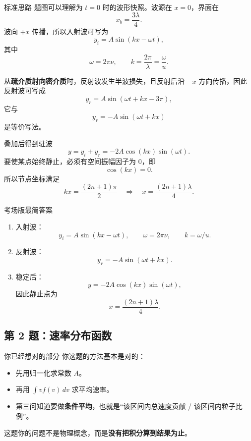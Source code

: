 \documentclass[11pt,a4paper]{ctexart}
\newcommand{\key}[1]{\textcolor{theme}{\textbf{#1}}}
\begin{document}
\begin{stepbox}{标准思路}
题图可以理解为 \(t=0\) 时的波形快照。波源在 \(x=0\)，界面在
\[
x_b=\frac{3\lambda}{4}.
\]
波向 \(+x\) 传播，所以入射波可写为
\[
y_i = A\sin(kx-\omega t),
\]
其中
\[
\omega = 2\pi \nu,\qquad k=\frac{2\pi}{\lambda}=\frac{\omega}{u}.
\]

从\key{疏介质射向密介质}时，反射波发生半波损失，且反射后沿 \(-x\) 方向传播，因此反射波可写成
\[
y_r = A\sin(\omega t + kx - 3\pi),
\]
它与
\[
y_r=-A\sin(\omega t+kx)
\]
是等价写法。

叠加后得到驻波
\[
y=y_i+y_r=-2A\cos(kx)\sin(\omega t).
\]
要使某点始终静止，必须有空间振幅因子为 0，即
\[
\cos(kx)=0.
\]
所以节点坐标满足
\[
kx=\frac{(2n+1)\pi}{2}
\quad\Rightarrow\quad
x=\frac{(2n+1)\lambda}{4}.
\]
\end{stepbox}

\begin{summarybox}{考场版最简答案}
\begin{enumerate}
  \item 入射波：
  \[
  y_i=A\sin(kx-\omega t),\qquad \omega=2\pi\nu,\qquad k=\omega/u.
  \]
  \item 反射波：
  \[
  y_r=-A\sin(\omega t+kx).
  \]
  \item 稳定后：
  \[
  y=-2A\cos(kx)\sin(\omega t),
  \]
  因此静止点为
  \[
  x=\frac{(2n+1)\lambda}{4}.
  \]
\end{enumerate}
\end{summarybox}

\subsection*{第 2 题：速率分布函数}

\begin{goodbox}{你已经想对的部分}
你这题的方法基本是对的：
\begin{itemize}
  \item 先用归一化求常数 \(A\)。
  \item 再用 \(\int v f(v)\,dv\) 求平均速率。
  \item 第三问知道要做\key{条件平均}，也就是“该区间内总速度贡献 / 该区间内粒子比例”。
\end{itemize}
这题你的问题不是物理概念，而是\key{没有把积分算到结果为止}。
\end{goodbox}
\end{document}
